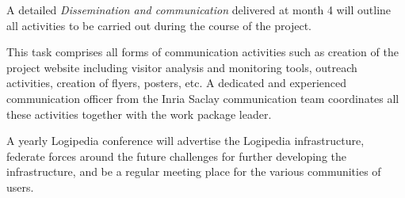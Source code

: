 \begin{workpackage}[id=dissemination,type=MGT,wphases=1-48,
  short={Dissemination},
  title={Dissemination, communication and exploitation},
  lead=Lie,LieRM=3,InrRM=6,BirRM=4,CleRM=2,ImtRM=2,StrRM=2,ZibRM=14,EduRM=12]
\begin{wpobjectives}
    A detailed {\em Dissemination and communication} delivered at month 4 will
    outline all activities to be carried out during the course of the project.
  \end{wpobjectives}


\begin{tasklist}

  \begin{task}[id=com,
      title=Communication,
      shorttitle=Comm.,
      lead=Inr,InrRM=4,wphases=1-48!.25]
    This task comprises all forms of communication activities such as
    creation of the project website including visitor analysis and
    monitoring tools, outreach activities, creation of flyers,
    posters, etc.  A dedicated and experienced communication officer
    from the Inria Saclay communication team coordinates all these
    activities together with the work package leader.
  \end{task}

  \begin{task}[id=dissem,
      title=Dissemination,
      shorttitle=Dissem.,
      lead=Lie,InrRM=2,LieRM=3,wphases=1-48]
    A yearly Logipedia conference will advertise the
    Logipedia infrastructure, federate forces around the future challenges for
    further developing the infrastructure, and be a regular meeting place for
    the various communities of users.

  \end{task}


\end{tasklist}
\end{workpackage}
